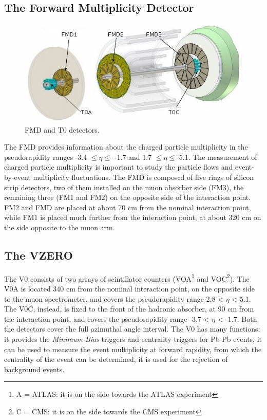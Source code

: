 \subsection*{The Forward Multiplicity Detector}
\begin{figure}
  \centering
  \includegraphics[scale=0.50]{figures/FMD.jpg}
  \caption{FMD and T0 detectors.}
  \label{fig:FMD}
\end{figure}
%
The FMD provides information about the charged particle multiplicity in the pseudorapidity ranges -3.4 $\leq \eta \leq$ -1.7 and 1.7 $\leq \eta \leq$ 5.1. The measurement of charged particle multiplicity is important to study the particle flows and event-by-event multiplicity fluctuations. The FMD is composed of five rings of silicon strip detectors, two of them installed on the muon absorber side (FM3), the remaining three (FM1 and FM2) on the opposite side of the interaction point. FM2 and FMD are placed at about 70 cm from the nominal interaction point, while FM1 is placed much further from the interaction point, at about 320 cm on the side opposite to the muon arm.
\subsection*{The VZERO}
The V0 consists of two arrays of scintillator counters (VOA\footnote{A = ATLAS: it is on the side towards the ATLAS experiment} and VOC\footnote{C = CMS: it is on the side towards the CMS experiment}). The V0A is located 340 cm from the nominal interaction point, on the opposite side to the muon spectrometer, and covers the pseudorapidity range 2.8 < $\eta$ < 5.1. The V0C, instead, is fixed to the front of the hadronic absorber, at 90 cm from the interaction point, and covers the pseudorapidity range -3.7 < $\eta$ < -1.7. Both the detectors cover the full azimuthal angle interval. The V0 has many functions: it provides the \textit{Minimum-Bias} triggers and centrality triggers for Pb-Pb events, it can be used to measure the event multiplicity at forward rapidity, from which the centrality of the event can be determined, it is used for the rejection of background events.
